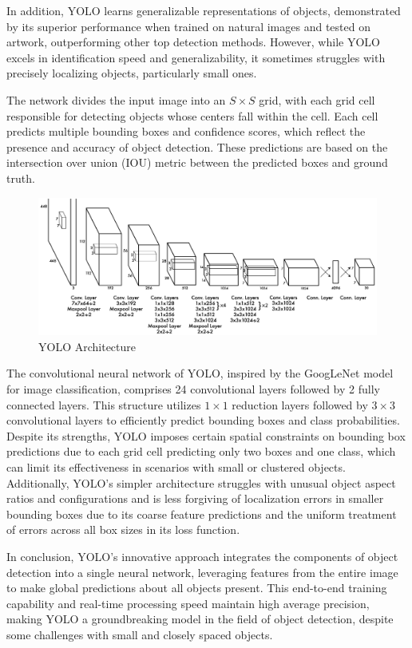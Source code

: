 In addition, YOLO learns generalizable representations of objects, demonstrated by its superior performance when trained on natural images and tested on 
artwork, outperforming other top detection methods. However, while YOLO excels in identification speed and generalizability, it sometimes struggles with 
precisely localizing objects, particularly small ones. 


\newpage
The network divides the input image into an \(S \times S\) grid, with each grid cell responsible for 
detecting objects whose centers fall within the cell. Each cell predicts multiple bounding boxes and confidence scores, which reflect the presence and 
accuracy of object detection. These predictions are based on the intersection over union (IOU) metric between the predicted boxes and ground truth.

\begin{figure}[h!]
    \centering
    \includegraphics[scale=0.55]{Figures/yolo.jpg}
    \caption{YOLO Architecture \cite{yolo}}
    \label{fig:yolo}
\end{figure}


The convolutional neural network of YOLO, inspired by the GoogLeNet model for image classification, comprises 24 convolutional layers followed by 2 fully 
connected layers. This structure utilizes \(1 \times 1\) reduction layers followed by \(3 \times 3\) convolutional layers to efficiently predict bounding 
boxes and class probabilities. Despite its strengths, YOLO imposes certain spatial constraints on bounding box predictions due to each grid cell predicting 
only two boxes and one class, which can limit its effectiveness in scenarios with small or clustered objects. Additionally, YOLO's simpler architecture 
struggles with unusual object aspect ratios and configurations and is less forgiving of localization errors in smaller bounding boxes due to its coarse 
feature predictions and the uniform treatment of errors across all box sizes in its loss function.

In conclusion, YOLO’s innovative approach integrates the components of object detection into a single neural network, leveraging features from the entire 
image to make global predictions about all objects present. This end-to-end training capability and real-time processing speed maintain high average 
precision, making YOLO a groundbreaking model in the field of object detection, despite some challenges with small and closely spaced objects.


